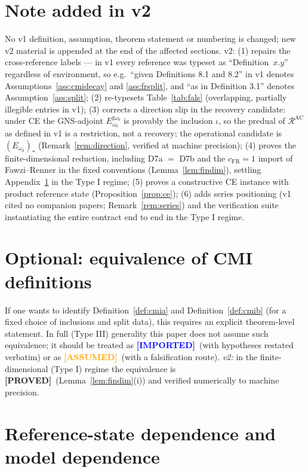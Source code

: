 \documentclass[11pt]{article}
\theoremstyle{definition}
\theoremstyle{remark}
\newcommand{\ASSUMED}{\textcolor{orange}{\textbf{[ASSUMED]}}}
\newcommand{\PROVED}{\textcolor{green!60!black}{\textbf{[PROVED]}}}
\newcommand{\IMPORTED}{\textcolor{blue}{\textbf{[IMPORTED]}}}
\newcommand{\cR}{\mathcal{R}}
\begin{document}
\section*{Note added in v2}
No v1 definition, assumption, theorem statement or numbering is changed;
new v2 material is appended at the end of the affected sections. v2: (1)
repairs the cross-reference labels --- in v1 every reference was typeset
as ``Definition~$x.y$'' regardless of environment, so e.g.\ ``given
Definitions 8.1 and 8.2'' in v1 denotes
Assumptions~\ref{ass:cmidecay} and \ref{ass:frsplit}, and ``as in
Definition 3.1'' denotes Assumption~\ref{ass:split}; (2) re-typesets
Table~\ref{tab:fals} (overlapping, partially illegible entries in v1);
(3) corrects a direction slip in the recovery candidate: under CE the
GNS-adjoint $E_{\omega_0}^{\sharp\omega_0}$ is provably the inclusion
$\iota$, so the predual of $\cR^{\mathrm{AC}}$ as defined in v1 is a
restriction, not a recovery; the operational candidate is
$(E_{\omega_0})_*$ (Remark~\ref{rem:direction}, verified at machine
precision); (4) proves the finite-dimensional reduction, including
D7a $=$ D7b and the $c_{\mathrm{FR}} = 1$ import of Fawzi--Renner in the
fixed conventions (Lemma~\ref{lem:findim}), settling
Appendix~\ref{app:equiv} in the Type I regime; (5) proves a constructive
CE instance with product reference state (Proposition~\ref{prop:ce});
(6) adds series positioning (v1 cited no companion papers;
Remark~\ref{rem:series}) and the verification suite instantiating the
entire contract end to end in the Type I regime.

\appendix

\section{Optional: equivalence of CMI definitions}
\label{app:equiv}

If one wants to identify Definition~\ref{def:cmia} and
Definition~\ref{def:cmib} (for a fixed choice of inclusions and split
data), this requires an explicit theorem-level statement. In full
(Type III) generality this paper does not assume such equivalence; it
should be treated as \IMPORTED\ (with hypotheses restated verbatim) or
as \ASSUMED\ (with a falsification route). \emph{v2:} in the
finite-dimensional (Type I) regime the equivalence is \PROVED\
(Lemma~\ref{lem:findim}(i)) and verified numerically to machine
precision.

\section{Reference-state dependence and model dependence}
\label{app:refstate}
\end{document}
